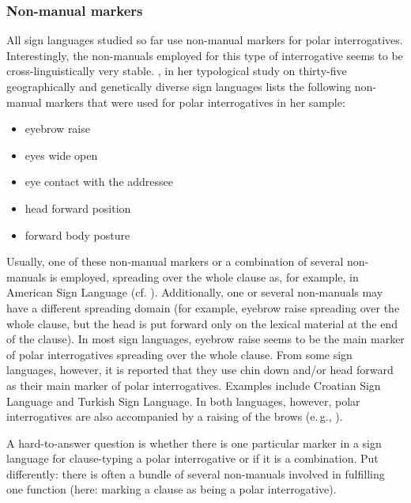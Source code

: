 \subsubsection{Non-manual markers}
All\label{nnmpolarintsign} sign languages studied so far use non-manual markers for polar interrogatives. Interestingly, the non-manuals employed for this type of interrogative seems to be cross-linguistically very stable. \citet[19]{zeshan2004interrogative}, in her typological study on thirty-five geographically and genetically diverse sign languages lists the following non-manual markers that were used for polar interrogatives in her sample:

\begin{itemize}[itemsep=0pt]
	\item eyebrow raise
	\item eyes wide open
	\item eye contact with the addressee
	\item head forward position
	\item forward body posture
\end{itemize}

\noindent Usually, one of these non-manual markers or a combination of several non-manuals is employed, spreading over the whole clause as, for example, in American Sign Language (cf. \citealt{wilbur1999syntactic}). Additionally, one or several non-manuals may have a different spreading domain (for example, eyebrow raise spreading over the whole clause, but the head is put forward only on the lexical material at the end of the clause). In most sign languages, eyebrow raise seems to be the main marker of polar interrogatives spreading over the whole clause. From some sign languages, however, it is reported that they use chin down and/or head forward as their main marker of polar interrogatives. Examples include Croatian Sign Language and Turkish Sign Language. In both languages, however, polar interrogatives are also accompanied by a raising of the brows (e.\,g., \citealt{sarac2006interrogative}).

A hard-to-answer question is whether there is one particular marker in a sign language for clause-typing a polar interrogative or if it is a combination. Put differently: there is often a bundle of several non-manuals involved in fulfilling one function (here: marking a clause as being a polar interrogative).

